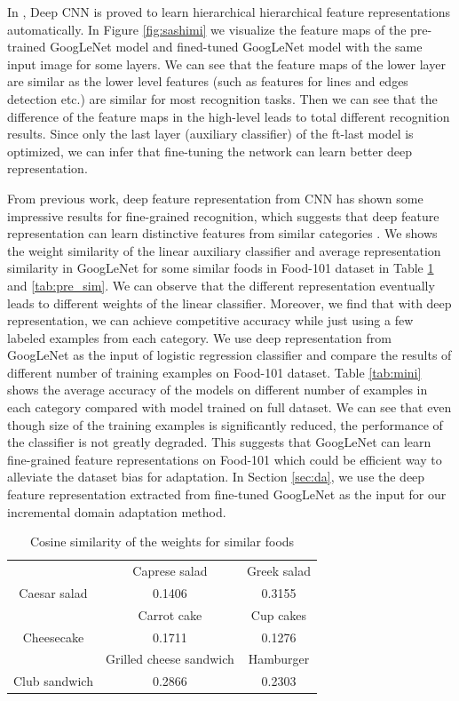 In \cite{farabet2013learning}, Deep CNN is proved to learn hierarchical hierarchical feature representations automatically.
In Figure \ref{fig:sashimi} we visualize the feature maps of the pre-trained GoogLeNet model and fined-tuned GoogLeNet model with the same input image for some layers. We can see that the feature maps of the lower layer are similar as the lower level features (such as features for lines and edges detection etc.) are similar for most recognition tasks.
Then we can see that the difference of the feature maps in the high-level leads to total different recognition results.
Since only the last layer (auxiliary classifier) of the ft-last model is optimized, we can infer that fine-tuning the network can learn better deep representation.

From previous work, deep feature representation from CNN has shown some impressive results for fine-grained recognition, which suggests that deep feature representation can learn distinctive features from similar categories \cite{zhang2014part} \cite{razavian2014cnn}. We shows the weight similarity of the linear auxiliary classifier and average representation similarity in GoogLeNet for some similar foods in Food-101 dataset in Table \ref{tab:weight_sim} and \ref{tab:pre_sim}. We can observe that the different representation eventually leads to different weights of the linear classifier.
Moreover, we find that with deep representation, we can achieve competitive accuracy while just using a few labeled examples from each category.
We use deep representation from GoogLeNet as the input of logistic regression classifier and compare the results of different number of training examples on Food-101 dataset.
Table \ref{tab:mini} shows the average accuracy of the models on different number of examples in each category compared with model trained on full dataset. We can see that even though size of the training examples is significantly reduced, the performance of the classifier is not greatly degraded.
This suggests that GoogLeNet can learn fine-grained feature representations on Food-101 which could be efficient way to alleviate the dataset bias for adaptation. In Section \ref{sec:da}, we use the deep feature representation extracted from fine-tuned GoogLeNet as the input for our incremental domain adaptation method.
\begin{table}[htbp]
  \centering
  \caption{Cosine similarity of the weights for similar foods}
    \begin{tabular}{c|c|c}
    \toprule
          & Caprese salad & Greek salad \\
    Caesar salad & 0.1406 & 0.3155 \\
    \toprule
          & Carrot cake & Cup cakes \\
    Cheesecake & 0.1711 & 0.1276 \\
    \toprule
          & Grilled cheese sandwich & Hamburger \\
    Club sandwich & 0.2866 & 0.2303 \\
    \bottomrule
    \end{tabular}%
  \label{tab:weight_sim}%
\end{table}%
